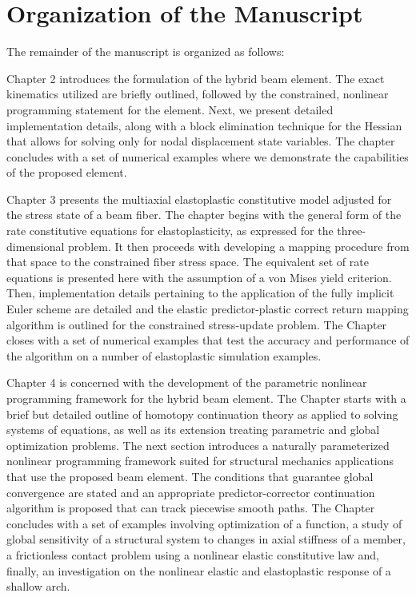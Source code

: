 \section{Organization of the Manuscript}
The remainder of the manuscript is organized as follows: 

Chapter 2 introduces the formulation of the hybrid beam element. The exact kinematics 
utilized are briefly outlined, followed by the constrained, nonlinear programming 
statement for the element. Next, we present detailed implementation details, along 
with a block elimination technique for the Hessian that allows for solving only for 
nodal displacement state variables. The chapter concludes with a set of numerical 
examples where we demonstrate the capabilities of the proposed element.

Chapter 3 presents the multiaxial elastoplastic constitutive model adjusted for the 
stress state of a beam fiber. The chapter begins with the general form of the rate 
constitutive equations for elastoplasticity, as expressed for the three-dimensional 
problem. It then proceeds with developing a mapping procedure from that space to the 
constrained fiber stress space. The equivalent set of rate equations is presented here 
with the assumption of a von Mises yield criterion. Then, implementation details 
pertaining to the application of the fully implicit Euler scheme are detailed and the 
elastic predictor-plastic correct return mapping algorithm is outlined for the 
constrained stress-update problem. The Chapter closes with a set of numerical examples 
that test the accuracy and performance of the algorithm on 
a number of elastoplastic simulation examples.

Chapter 4 is concerned with the development of the parametric nonlinear programming 
framework for the hybrid beam element. The Chapter starts with a brief but detailed 
outline of homotopy continuation theory as applied to solving systems of equations, as 
well as its extension treating parametric and global optimization problems. The 
next 
section introduces a naturally parameterized nonlinear programming framework 
suited 
for structural mechanics applications that use the proposed beam element. The 
conditions that guarantee global convergence are stated and an appropriate 
predictor-corrector continuation algorithm is proposed that can track piecewise smooth 
paths. The Chapter concludes with a set of examples involving optimization of a 
function, a study of global sensitivity of a structural system to changes in axial 
stiffness of a member, a frictionless contact problem using a nonlinear 
elastic constitutive law and, finally, an investigation on the nonlinear 
elastic and elastoplastic response of a shallow arch.

